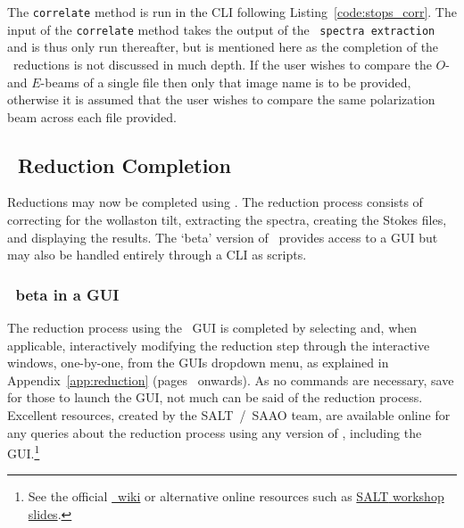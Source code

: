 The \texttt{correlate} method is run in the \gls{CLI} following Listing~\ref{code:stops_corr}. The input of the \texttt{correlate} method takes the output of the \polsalt\ \texttt{spectra extraction} and is thus only run thereafter, but is mentioned here as the completion of the \polsalt\ reductions is not discussed in much depth. If the user wishes to compare the $O$- and $E$-beams of a single file then only that image name is to be provided, otherwise it is assumed that the user wishes to compare the same polarization beam across each file provided.

\subsection{\polsalt\ Reduction Completion} \label{subsec:reduc_com}

Reductions may now be completed using \polsalt. The reduction process consists of correcting for the wollaston tilt, extracting the spectra, creating the Stokes files, and displaying the results. The `beta' version of \polsalt\ provides access to a \gls{GUI} but may also be handled entirely through a \gls{CLI} as scripts.

\subsubsection{\polsalt\ beta in a \gls{GUI}}

The reduction process using the \polsalt\ \gls{GUI} is completed by selecting and, when applicable, interactively modifying the reduction step through the interactive windows, one-by-one, from the \glspl{GUI} dropdown menu, as explained in Appendix~\ref{app:reduction} (pages~\pageref{code:stops_corr} onwards). As no commands are necessary, save for those to launch the \gls{GUI}, not much can be said of the reduction process. Excellent resources, created by the \gls{SALT}~/~\gls{SAAO} team, are available online for any queries about the reduction process using any version of \polsalt, including the \gls{GUI}.\footnote{See the official \href{https://github.com/saltastro/polsalt/wiki}{\polsalt\ wiki} or alternative online resources such as \href{https://saltworkshop2022.salt.ac.za/wp-content/uploads/2022/11/DG_polsalt_SALT_workshop_2022_finalversion.pdf}{\gls{SALT} workshop slides}.}


